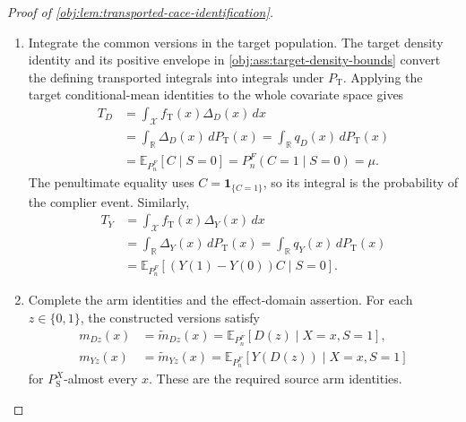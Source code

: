 \documentclass[11pt]{article}
\begin{document}
\begin{proof}[Proof of \cref{obj:lem:transported-cace-identification}]
\begin{enumerate}
The density identities in
\cref{obj:ass:source-density-bounds,obj:ass:target-density-bounds}
transfer these equalities to the target covariate law. Indeed, if a Borel set \(B\) is source-null, then
\[
0=P_{\mathrm S}^{X}(B)
=\int_{B\cap\mathcal X}f_{\mathrm S}(x)\,dx
\ge c_f\int_{B\cap\mathcal X}1\,dx.
\]
Since \(c_f>0\), the set \(B\cap\mathcal X\) is Lebesgue-null, and consequently
\[
P_{\mathrm T}(B)
=\int_{B\cap\mathcal X}f_{\mathrm T}(x)\,dx=0.
\]
Thus
\[
P_{\mathrm T}\ll P_{\mathrm S}^{X},
\qquad
\Delta_D=q_D,\quad\Delta_Y=q_Y
\quad P_{\mathrm T}\text{-almost everywhere}.
\]
Together with the conditional-mean identities for \(q_D,q_Y\), this supplies common versions for both chains in the statement.

\item Integrate the common versions in the target population. The target density identity and its positive envelope in
\cref{obj:ass:target-density-bounds} convert the defining transported integrals into integrals under \(P_{\mathrm T}\). Applying the target conditional-mean identities to the whole covariate space gives
\[
\begin{aligned}
T_D
&=\int_{\mathcal X}f_{\mathrm T}(x)\Delta_D(x)\,dx\\
&=\int_{\mathbb R}\Delta_D(x)\,dP_{\mathrm T}(x)
 =\int_{\mathbb R}q_D(x)\,dP_{\mathrm T}(x)\\
&=\mathbb E_{P_n^F}[C\mid S=0]
 =P_n^F(C=1\mid S=0)=\mu.
\end{aligned}
\]
The penultimate equality uses
\(C=\mathbf1_{\{C=1\}}\), so its integral is the probability of the complier event. Similarly,
\[
\begin{aligned}
T_Y
&=\int_{\mathcal X}f_{\mathrm T}(x)\Delta_Y(x)\,dx\\
&=\int_{\mathbb R}\Delta_Y(x)\,dP_{\mathrm T}(x)
 =\int_{\mathbb R}q_Y(x)\,dP_{\mathrm T}(x)\\
&=\mathbb E_{P_n^F}[(Y(1)-Y(0))C\mid S=0].
\end{aligned}
\]

\item Complete the arm identities and the effect-domain assertion. For each \(z\in\{0,1\}\), the constructed versions satisfy
\[
\begin{aligned}
m_{Dz}(x)
&=\widetilde m_{Dz}(x)
 =\mathbb E_{P_n^F}[D(z)\mid X=x,S=1],\\
m_{Yz}(x)
&=\widetilde m_{Yz}(x)
 =\mathbb E_{P_n^F}[Y(D(z))\mid X=x,S=1]
\end{aligned}
\]
for \(P_{\mathrm S}^{X}\)-almost every \(x\). These are the required source arm identities.


\end{enumerate}
\end{proof}
\end{document}
